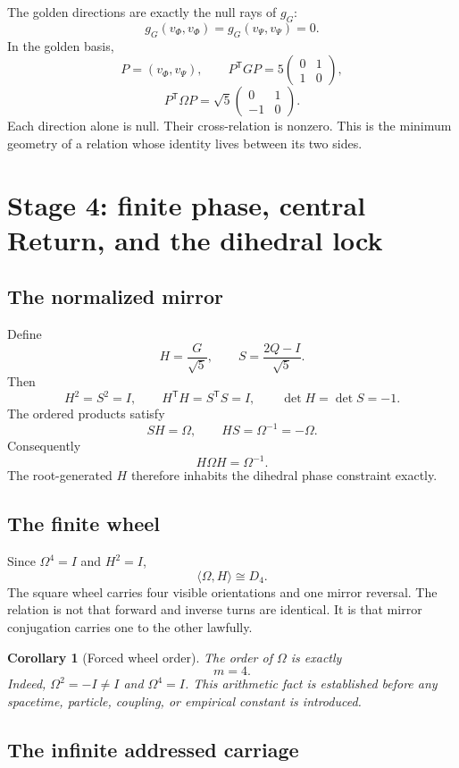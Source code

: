 \documentclass[11pt]{article}
\newtheorem{corollary}[theorem]{Corollary}
\begin{document}
The golden directions are exactly the null rays of $g_G$:
\[
\boxed{g_G(v_\Phi,v_\Phi)=g_G(v_\Psi,v_\Psi)=0.}
\]
In the golden basis,
\[
P=(v_\Phi,v_\Psi),
\qquad
P^{\mathsf T}GP=5
\begin{pmatrix}
0&1\\1&0
\end{pmatrix},
\]
\[
P^{\mathsf T}\Omega P=\sqrt5
\begin{pmatrix}
0&1\\-1&0
\end{pmatrix}.
\]
Each direction alone is null. Their cross-relation is nonzero. This is the minimum geometry of a relation whose identity lives between its two sides.

\section{Stage 4: finite phase, central Return, and the dihedral lock}

\subsection{The normalized mirror}

Define
\[
H=\frac{G}{\sqrt5},
\qquad
S=\frac{2Q-I}{\sqrt5}.
\]
Then
\[
H^2=S^2=I,
\qquad
H^{\mathsf T}H=S^{\mathsf T}S=I,
\qquad
\det H=\det S=-1.
\]
The ordered products satisfy
\[
SH=\Omega,
\qquad
HS=\Omega^{-1}=-\Omega.
\]
Consequently
\[
\boxed{H\Omega H=\Omega^{-1}.}
\]
The root-generated $H$ therefore inhabits the dihedral phase constraint exactly.

\subsection{The finite wheel}

Since $\Omega^4=I$ and $H^2=I$,
\[
\boxed{\langle\Omega,H\rangle\cong D_4.}
\]
The square wheel carries four visible orientations and one mirror reversal. The relation is not that forward and inverse turns are identical. It is that mirror conjugation carries one to the other lawfully.

\begin{corollary}[Forced wheel order]
The order of $\Omega$ is exactly
\[
\boxed{m=4.}
\]
Indeed, $\Omega^2=-I\neq I$ and $\Omega^4=I$. This arithmetic fact is established before any spacetime, particle, coupling, or empirical constant is introduced.
\end{corollary}

\subsection{The infinite addressed carriage}
\end{document}
